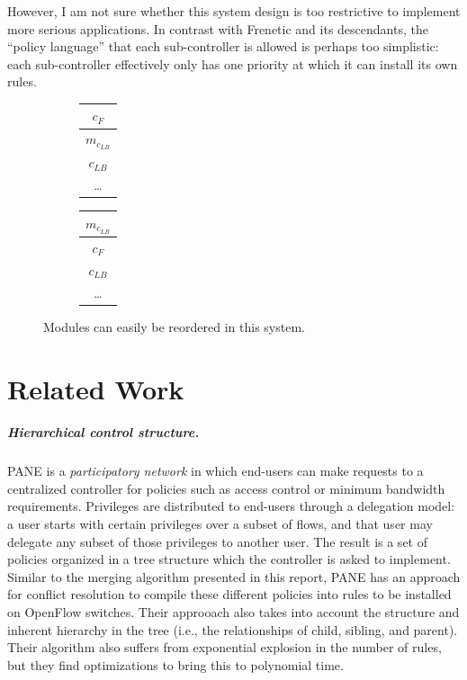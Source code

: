 \documentclass{article}
\begin{document}
\begin{itemize}
However, I am not sure whether this system design is too restrictive to 
implement more serious applications.
In contrast with Frenetic and its descendants, the ``policy language'' that 
each sub-controller is allowed is perhaps too simplistic: each sub-controller 
effectively only has one priority at which it can install its own rules.
\end{itemize}

\begin{figure}
\centering
\begin{subfigure}{.25\textwidth}
\begin{center}
\begin{tabular}{|c|}
\hline
$c_F$ \\
\hline
$m_{c_{LB}}$ \\
\hline
$c_{LB}$ \\
\hline
\dots
\end{tabular}
\end{center}
\end{subfigure}
\begin{subfigure}{.25\textwidth}
\begin{center}
\begin{tabular}{|c|}
\hline
$m_{c_{LB}}$ \\
\hline
$c_F$ \\
\hline
$c_{LB}$ \\
\hline
\dots
\end{tabular}
\end{center}  
\end{subfigure}
\caption{Modules can easily be reordered in this system.}
\label{fig:reordering}
\end{figure}

\section{Related Work} \label{REL}

\subparagraph{Hierarchical control structure.}

PANE \cite{participatory_networking} is a \emph{participatory network} in 
which end-users can make requests to a centralized controller for policies 
such as access control or minimum bandwidth requirements. 
Privileges are distributed to end-users
through a delegation model: a user starts with certain privileges over a 
subset of flows, and that user may delegate any subset of those privileges
to another user. The result is a set of policies organized in a tree structure
which the controller is asked to implement. Similar to the merging algorithm
presented in this report, PANE has an approach for conflict resolution
to compile these different policies into rules to be installed on OpenFlow 
switches.
Their approoach also takes into account the structure and inherent hierarchy 
in the tree (i.e., the relationships of child, sibling, and parent). 
Their algorithm also suffers from exponential explosion in the number of
rules, but they find optimizations to bring this to polynomial time.
\end{document}
